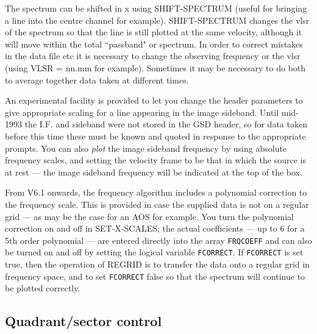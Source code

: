 \documentclass[11pt,twoside]{report}
\begin{document}
The spectrum can be shifted in x using SHIFT-SPECTRUM (useful for bringing a
line into the centre channel for example). SHIFT-SPECTRUM changes the vlsr of
 the spectrum so that the line is still plotted at the same
velocity, although it will move within the total ``passband" or spectrum. In
order to correct mistakes in the data file etc it is necessary to change the
observing frequency or the vlsr (using VLSR = nn.mm for example).
Sometimes it may be necessary to do both to average together data
 taken at different times. 

An experimental facility is provided to let you change the header parameters to
give appropriate scaling for a line appearing in the image sideband.
 
Until mid-1993 the I.F.  and sideband were not stored in the GSD header, so for data taken
before this time these must be known and quoted in
response to the appropriate prompts.
You can also {\em plot} the image sideband
frequency by using absolute frequency scales, and setting the velocity frame
to be that in which the source is at rest --- the image sideband frequency
will be indicated at the top of the box.

From V6.1 onwards, the frequency algorithm includes a polynomial correction to
the frequency scale. This is provided in case the supplied data is not on a
regular grid --- as may be the case for an AOS for example. You turn the 
polynomial correction on and off in SET-X-SCALES; the actual coefficients ---
up to 6 for a 5th order polynomial --- are entered directly into the array
\verb+FRQCOEFF+ and can also be turned on and off by
setting the logical variable \verb+FCORRECT+. If
\verb+FCORRECT+ is set true, then the operation of REGRID is to transfer the
data onto a regular grid in frequency space, and to set \verb+FCORRECT+ false
so that the spectrum will continue to be plotted correctly.

\subsection{Quadrant/sector control}
 
\end{document}
